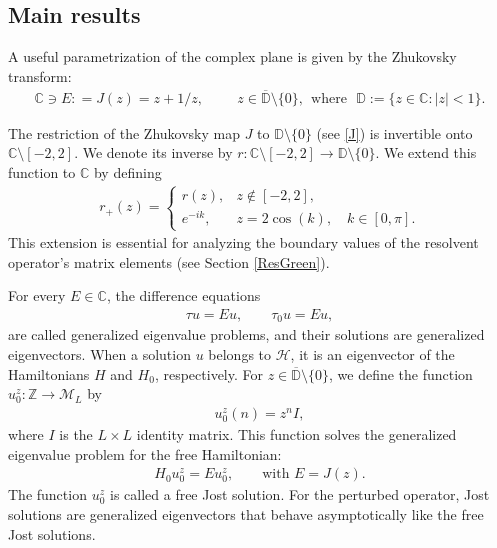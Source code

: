 \documentclass[12pt,oneside,onecolumn,open]{article}
\begin{document}
\subsection{Main results}\label{MR}

A useful parametrization of the complex plane is given by the Zhukovsky  transform:
\begin{align}\label{J}
 \mathbb{C} \ni  E : = J(z) = z+ 1/z,    \hspace{1cm}z\in \overline{\mathbb{D}}\setminus \{0\},  \: \: \text{where} \: 
 \: 
 \: \mathbb{D}:=\{z\in \mathbb{C}:|z|< 1\}. 
 \end{align}

The restriction of the Zhukovsky map \(J\) to \(\mathbb{D} \setminus \{ 0 \}\) (see \eqref{J}) is invertible onto \(\mathbb{C} \setminus [-2,2]\). We denote its inverse by \( r : \mathbb{C} \setminus [-2,2] \to \mathbb{D}\setminus \{0 \} \).
We extend this function to \(\mathbb{C}\) by defining
\begin{align} \label{r_+}
    r_+(z) = \begin{cases}
        r(z), & z \notin [-2,2], \\
        e^{-ik}, & z = 2 \cos(k), \quad k \in [0,\pi].
    \end{cases}
\end{align}
\color{black}
This extension is essential for analyzing the boundary values of the resolvent operator's matrix elements (see Section \ref{ResGreen}).

For every \(E \in \mathbb{C}\), the difference equations
\begin{align}\label{eigen}
 \tau u = E u, \qquad \tau_0 u = E u,
 \end{align}
are called generalized eigenvalue problems, and their solutions are generalized eigenvectors. When a solution \(u\) belongs to \(\mathcal{H}\), it is an eigenvector of the Hamiltonians \(H\) and \(H_0\), respectively. For \( z \in \overline{\mathbb{D}} \setminus \{0\} \), we define the function \( u^z_0 : \mathbb{Z} \to \mathcal{M}_L \) by
\begin{align}\label{JostLibre}
    u^z_0(n) = z^n I,
\end{align}
where \(I\) is the \(L\times L\) identity matrix. This function solves the generalized eigenvalue problem for the free Hamiltonian:
\begin{align}
    H_0 u_0^z = E u_0^z, \qquad \text{with } E = J(z).
\end{align}
The function \( u_0^z \) is called a free Jost solution. For the perturbed operator, Jost solutions are generalized eigenvectors that behave asymptotically like the free Jost solutions.
\end{document}
